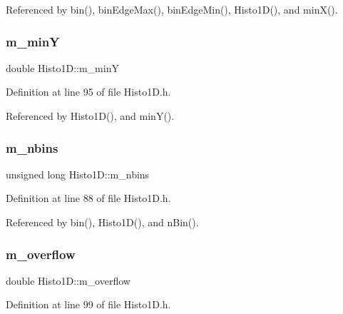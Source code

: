 Referenced by bin(), bin\+Edge\+Max(), bin\+Edge\+Min(), Histo1\+D(), and min\+X().

\mbox{\label{classHisto1D_a3bb6c3ea23a1af14ebb10af807f3810d}} 
\subsubsection{\texorpdfstring{m\+\_\+minY}{m\_minY}}
{\footnotesize\ttfamily double Histo1\+D\+::m\+\_\+minY\hspace{0.3cm}{\ttfamily [private]}}



Definition at line 95 of file Histo1\+D.\+h.



Referenced by Histo1\+D(), and min\+Y().

\mbox{\label{classHisto1D_a1913aca9a278b4bfd365f35b85e65d8d}} 
\subsubsection{\texorpdfstring{m\+\_\+nbins}{m\_nbins}}
{\footnotesize\ttfamily unsigned long Histo1\+D\+::m\+\_\+nbins\hspace{0.3cm}{\ttfamily [private]}}



Definition at line 88 of file Histo1\+D.\+h.



Referenced by bin(), Histo1\+D(), and n\+Bin().

\mbox{\label{classHisto1D_ab60b2ec4e435a3094b7ec218404aa16f}} 
\subsubsection{\texorpdfstring{m\+\_\+overflow}{m\_overflow}}
{\footnotesize\ttfamily double Histo1\+D\+::m\+\_\+overflow\hspace{0.3cm}{\ttfamily [private]}}



Definition at line 99 of file Histo1\+D.\+h.



